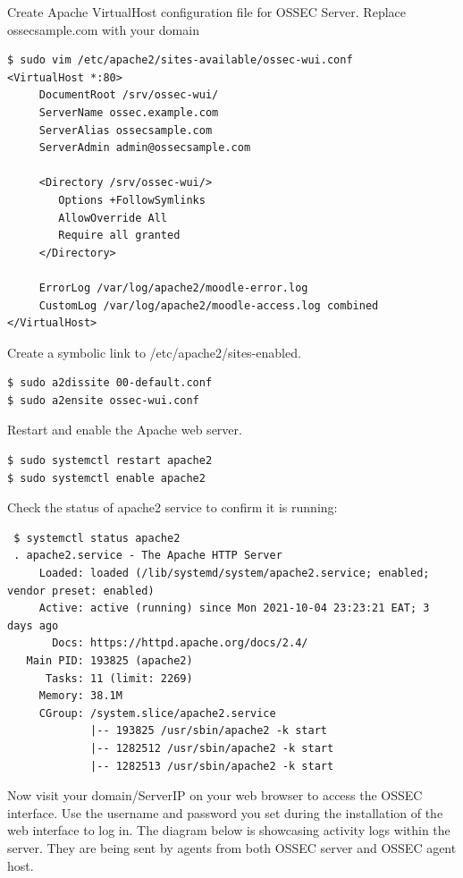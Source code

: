 \documentclass{article}
\begin{document}
Create Apache VirtualHost configuration file for OSSEC Server. Replace ossecsample.com with your domain
\begin{verbatim}
$ sudo vim /etc/apache2/sites-available/ossec-wui.conf
<VirtualHost *:80>
     DocumentRoot /srv/ossec-wui/
     ServerName ossec.example.com
     ServerAlias ossecsample.com
     ServerAdmin admin@ossecsample.com

     <Directory /srv/ossec-wui/>
        Options +FollowSymlinks
        AllowOverride All
        Require all granted
     </Directory>

     ErrorLog /var/log/apache2/moodle-error.log
     CustomLog /var/log/apache2/moodle-access.log combined
</VirtualHost>
\end{verbatim}

Create a symbolic link to /etc/apache2/sites-enabled.

\begin{verbatim}
$ sudo a2dissite 00-default.conf
$ sudo a2ensite ossec-wui.conf
\end{verbatim}
Restart and enable the Apache web server.

\begin{verbatim}
$ sudo systemctl restart apache2
$ sudo systemctl enable apache2
\end{verbatim}
Check the status of apache2 service to confirm it is running:

\begin{verbatim}
 $ systemctl status apache2 
 . apache2.service - The Apache HTTP Server
     Loaded: loaded (/lib/systemd/system/apache2.service; enabled; vendor preset: enabled)
     Active: active (running) since Mon 2021-10-04 23:23:21 EAT; 3 days ago
       Docs: https://httpd.apache.org/docs/2.4/
   Main PID: 193825 (apache2)
      Tasks: 11 (limit: 2269)
     Memory: 38.1M
     CGroup: /system.slice/apache2.service
             |-- 193825 /usr/sbin/apache2 -k start
             |-- 1282512 /usr/sbin/apache2 -k start
             |-- 1282513 /usr/sbin/apache2 -k start   
\end{verbatim}

Now visit your domain/ServerIP on your web browser to access the OSSEC interface.
Use the username and password you set during the installation of the web interface to log in.
The diagram below is showcasing activity logs within the server. They are being sent by agents from both OSSEC server and OSSEC agent host.
\end{document}
